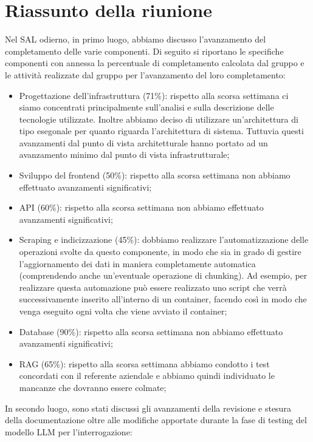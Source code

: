 \section{Riassunto della riunione}
Nel SAL odierno, in primo luogo, abbiamo discusso l'avanzamento del completamento delle varie componenti. Di seguito si riportano le specifiche componenti con annessa la percentuale di completamento calcolata dal gruppo e le attività realizzate dal gruppo per l'avanzamento del loro completamento:
\begin{itemize} 
    \item Progettazione dell'infrastruttura (71\%): rispetto alla scorsa settimana ci siamo concentrati principalmente sull'analisi e sulla descrizione delle tecnologie utilizzate. Inoltre abbiamo deciso di utilizzare un'architettura di tipo esegonale per quanto riguarda l'architettura di sistema. Tuttuvia questi avanzamenti dal punto di vista architetturale hanno portato ad un avanzamento minimo dal punto di vista infrastrutturale;
    \item Sviluppo del frontend (50\%): rispetto alla scorsa settimana non abbiamo effettuato avanzamenti significativi;
    \item API (60\%): rispetto alla scorsa settimana non abbiamo effettuato avanzamenti significativi;
    \item Scraping e indicizzazione (45\%): dobbiamo realizzare l'automatizzazione delle operazioni svolte da questo componente, in modo che sia in grado di gestire l'aggiornamento dei dati in maniera completamente automatica (comprendendo anche un'eventuale operazione di chunking). Ad esempio, per realizzare questa automazione può essere realizzato uno script che verrà successivamente inserito all'interno di un container, facendo così in modo che venga eseguito ogni volta che viene avviato il container;
    \item Database (90\%): rispetto alla scorsa settimana non abbiamo effettuato avanzamenti significativi;
    \item RAG (65\%): rispetto alla scorsa settimana abbiamo condotto i test concordati con il referente aziendale e abbiamo quindi individuato le mancanze che dovranno essere colmate;
\end{itemize}
In secondo luogo, sono stati discussi gli avanzamenti della revisione e stesura della documentazione oltre alle modifiche apportate durante la fase di testing del modello LLM per l'interrogazione:
